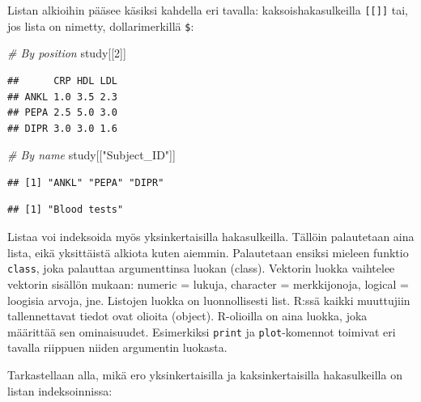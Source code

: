 \documentclass[
]{book}
\newenvironment{Shaded}{\begin{snugshade}}{\end{snugshade}}
\newcommand{\CommentTok}[1]{\textcolor[rgb]{0.56,0.35,0.01}{\textit{#1}}}
\newcommand{\DecValTok}[1]{\textcolor[rgb]{0.00,0.00,0.81}{#1}}
\newcommand{\NormalTok}[1]{#1}
\newcommand{\SpecialCharTok}[1]{\textcolor[rgb]{0.00,0.00,0.00}{#1}}
\newcommand{\StringTok}[1]{\textcolor[rgb]{0.31,0.60,0.02}{#1}}
\begin{document}
Listan alkioihin pääsee käsiksi kahdella eri tavalla: kaksoishakasulkeilla \texttt{{[}{[}{]}{]}} tai, jos lista on nimetty, dollarimerkillä \texttt{\$}:

\begin{Shaded}
\begin{Highlighting}[]
\CommentTok{\# By position}
\NormalTok{study[[}\DecValTok{2}\NormalTok{]]}
\end{Highlighting}
\end{Shaded}

\begin{verbatim}
##      CRP HDL LDL
## ANKL 1.0 3.5 2.3
## PEPA 2.5 5.0 3.0
## DIPR 3.0 3.0 1.6
\end{verbatim}

\begin{Shaded}
\begin{Highlighting}[]
\CommentTok{\# By name}
\NormalTok{study[[}\StringTok{"Subject\_ID"}\NormalTok{]]}
\end{Highlighting}
\end{Shaded}

\begin{verbatim}
## [1] "ANKL" "PEPA" "DIPR"
\end{verbatim}

\begin{Shaded}
\end{Shaded}

\begin{verbatim}
## [1] "Blood tests"
\end{verbatim}

Listaa voi indeksoida myös yksinkertaisilla hakasulkeilla. Tällöin palautetaan aina lista, eikä yksittäistä alkiota kuten aiemmin. Palautetaan ensiksi mieleen funktio \texttt{class}, joka palauttaa argumenttinsa luokan (class). Vektorin luokka vaihtelee vektorin sisällön mukaan: numeric = lukuja, character = merkkijonoja, logical = loogisia arvoja, jne. Listojen luokka on luonnollisesti list. R:ssä kaikki muuttujiin tallennettavat tiedot ovat olioita (object). R-olioilla on aina luokka, joka määrittää sen ominaisuudet. Esimerkiksi \texttt{print} ja \texttt{plot}-komennot toimivat eri tavalla riippuen niiden argumentin luokasta.

Tarkastellaan alla, mikä ero yksinkertaisilla ja kaksinkertaisilla hakasulkeilla on listan indeksoinnissa:
\end{document}
